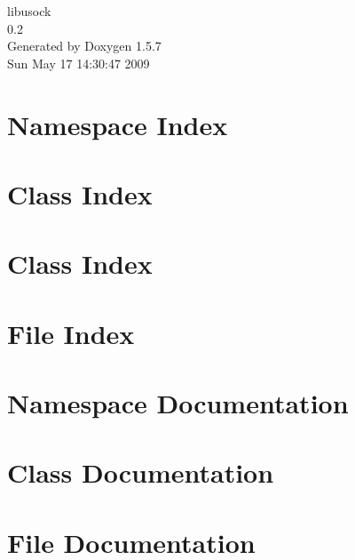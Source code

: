 \documentclass[a4paper]{book}
\begin{document}
\begin{titlepage}
\vspace*{7cm}
\begin{center}
{\Large libusock \\[1ex]\large 0.2 }\\
\vspace*{1cm}
{\large Generated by Doxygen 1.5.7}\\
\vspace*{0.5cm}
{\small Sun May 17 14:30:47 2009}\\
\end{center}
\end{titlepage}
\clearemptydoublepage
{}
\tableofcontents
\clearemptydoublepage
{}
\chapter{Namespace Index}

\chapter{Class Index}

\chapter{Class Index}

\chapter{File Index}

\chapter{Namespace Documentation}

\chapter{Class Documentation}






\chapter{File Documentation}


\printindex
\end{document}
